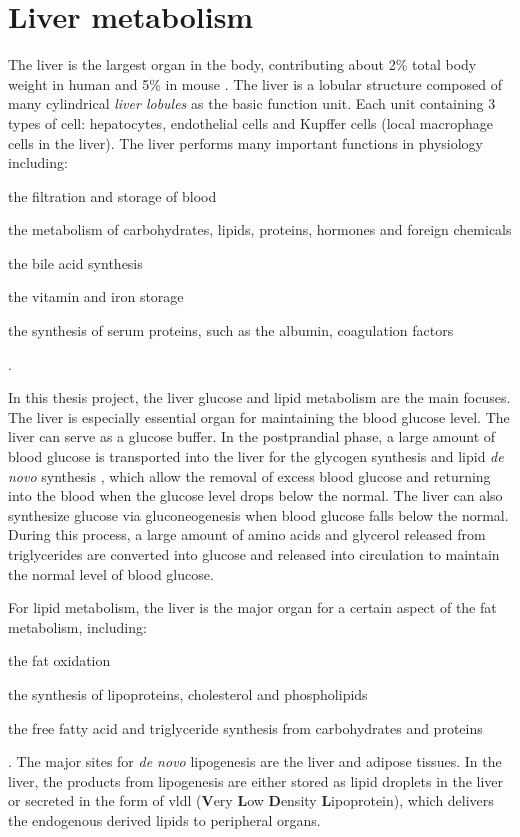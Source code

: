 \section{Liver metabolism}

The liver is the largest organ in the body, contributing about 2\% total body weight in human and 5\% in mouse \cite{hall_guyton_2010}. The liver is a lobular structure composed of many cylindrical \textit{liver lobules} as the basic function unit. Each unit containing 3 types of cell: hepatocytes, endothelial cells and Kupffer cells (local macrophage cells in the liver). The liver performs many important functions in physiology including:
\begin{inparaenum}[(1)]
\item the filtration and storage of blood
\item the metabolism of carbohydrates, lipids, proteins, hormones and foreign chemicals
\item the bile acid synthesis
\item the vitamin and iron storage
\item the synthesis of serum proteins, such as the albumin, coagulation factors
\end{inparaenum} \cite{hall_guyton_2010}.

In this thesis project, the liver glucose and lipid metabolism are the main focuses. The liver is especially essential organ for maintaining the blood glucose level. The liver can serve as a glucose buffer. In the postprandial phase, a large amount of blood glucose is transported into the liver for the glycogen synthesis and lipid \textit{de novo} synthesis \cite{moore_regulation_2012}, which allow the removal of excess blood glucose and returning into the blood when the glucose level drops below the normal. The liver can also synthesize glucose via gluconeogenesis when blood glucose falls below the normal. During this process, a large amount of amino acids and glycerol released from triglycerides are converted into glucose and released into circulation to maintain the normal level of blood glucose. 

For lipid metabolism, the liver is the major organ for a certain aspect of the fat metabolism, including:
\begin{inparaenum}[(1)]
\item the fat oxidation
\item the synthesis of lipoproteins, cholesterol and phospholipids
\item the free fatty acid and triglyceride synthesis from carbohydrates and proteins
\end{inparaenum} \cite{hall_guyton_2010}. The major sites for \textit{de novo} lipogenesis are the liver and adipose tissues. In the liver, the products from lipogenesis are either stored as lipid droplets in the liver or secreted in the form of \gls{vldl} (\textbf{V}ery \textbf{L}ow \textbf{D}ensity \textbf{L}ipoprotein), which delivers the endogenous derived lipids to peripheral organs.   

